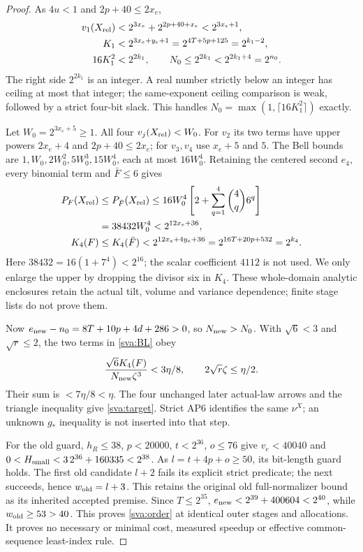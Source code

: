 \begin{proof}
As $4u<1$ and $2p+40\le2x_e$,
\begin{align}\label{sva:K1-enclosure}
 v_1(X_{\rm rel})&<2^{3x_e}+2^{2p+40+x_e}<2^{3x_e+1},\nonumber\\
 K_1&<2^{3x_e+y_e+1}=2^{4T+5p+125}=2^{k_1-2},\nonumber\\
 16K_1^2&<2^{2k_1},\qquad
 N_0\le2^{2k_1}<2^{2k_1+4}=2^{n_0}.
\end{align}
The right side $2^{2k_1}$ is an integer. A real number strictly below
an integer has ceiling at most that integer; the same-exponent ceiling
comparison is weak, followed by a strict four-bit slack. This handles
$N_0=\max(1,\lceil16K_1^2\rceil)$ exactly.

Let $W_0=2^{3x_e+5}\ge1$. All four $v_j(X_{\rm rel})<W_0$.
For $v_2$ its two terms have upper powers $2x_e+4$ and
$2p+40\le2x_e$; for $v_3,v_4$ use $x_e+5$ and $5$.
The Bell bounds are $1,W_0,2W_0^2,5W_0^3,15W_0^4$, each at most
$16W_0^4$. Retaining the centered second $e_4$, every binomial term
and $\bar F\le6$ gives
\begin{align}\label{sva:Bell-enclosure}
 P_F(X_{\rm rel})&\le P_{\bar F}(X_{\rm rel})
 \le16W_0^4\left[2+\sum_{q=1}^4\binom4q6^q\right]\nonumber\\
 &=38432W_0^4<2^{12x_e+36},\nonumber\\
 K_4(F)&\le K_4(\bar F)<2^{12x_e+4y_e+36}
                         =2^{16T+20p+532}=2^{k_4}.
\end{align}
Here $38432=16(1+7^4)<2^{16}$; the scalar coefficient $4112$ is not
used. We only enlarge the upper by dropping the divisor six in $K_4$.
These whole-domain analytic enclosures retain the actual tilt, volume
and variance dependence; finite stage lists do not prove them.

Now $e_{\rm new}-n_0=8T+10p+4d+286>0$, so $N_{\rm new}>N_0$.
With $\sqrt6<3$ and $\sqrt r\le2$, the two terms in \eqref{sva:BL}
obey
\begin{equation}\label{sva:allocation}
 {\sqrt6K_4(F)\over N_{\rm new}\zeta^3}<3\eta/8,
 \qquad2\sqrt r\zeta\le\eta/2.
\end{equation}
Their sum is $<7\eta/8<\eta$. The four unchanged later actual-law
arrows and the triangle inequality give \eqref{sva:target}. Strict
AP6 identifies the same $\nu^X$; an unknown $g_*$ inequality is not
inserted into that step.

For the old guard, $h_R\le38$, $p<20000$, $t<2^{36}$, $o\le76$
give $v_e<40040$ and $0<H_{\rm small}<3\,2^{36}+160335<2^{38}$.
As $l=t+4p+o\ge50$, its bit-length guard holds. The first old candidate
$l+2$ fails its explicit strict predicate; the next succeeds, hence
$w_{\rm old}=l+3$. This retains the original old full-normalizer bound
as its inherited accepted premise. Since $T\le2^{35}$,
$e_{\rm new}<2^{39}+400604<2^{40}$, while
$w_{\rm old}\ge53>40$. This proves \eqref{sva:order} at identical
outer stages and allocations. It proves no necessary or minimal cost,
measured speedup or effective common-sequence least-index rule.
\end{proof}

